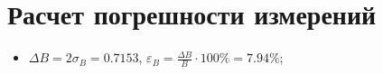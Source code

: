 \section{Расчет погрешности измерений}
\begin{itemize}
    \item $\Delta B = 2 \sigma_B = 0.7153$, $\varepsilon_B = \frac{\Delta B}{B} \cdot 100\% = 7.94\%$;
\end{itemize}
